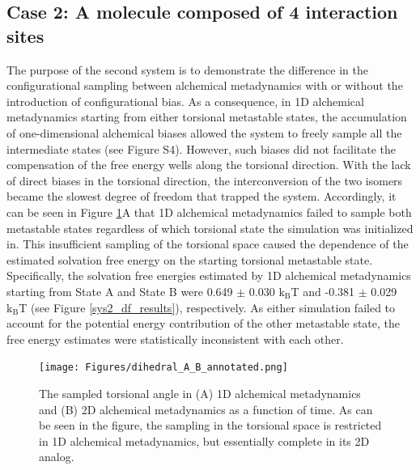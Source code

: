 \documentclass[journal=jacsat,manuscript=article]{achemso}
\begin{document}
\subsection{Case 2: A molecule composed of 4 interaction sites}
The purpose of the second system is to demonstrate the difference in the configurational sampling between alchemical metadynamics with or without the introduction of configurational bias. As a consequence, in 1D alchemical metadynamics starting from either torsional metastable states, the accumulation of one-dimensional alchemical biases allowed the system to freely sample all the intermediate states (see Figure S4). However, such biases did not facilitate the compensation of the free energy wells along the torsional direction. With the lack of direct biases in the torsional direction, the interconversion of the two isomers became the slowest degree of freedom that trapped the system. Accordingly, it can be seen in Figure \ref{dihedral_A_B}A that 1D alchemical metadynamics failed to sample both metastable states regardless of which torsional state the simulation was initialized in. This insufficient sampling of the torsional space caused the dependence of the estimated solvation free energy on the starting torsional metastable state. Specifically, the solvation free energies estimated by 1D alchemical metadynamics starting from State A and State B were 0.649 $\pm$ 0.030 $\text{k}_{\text{B}}\text{T}$ and -0.381 $\pm$ 0.029 $\text{k}_{\text{B}}\text{T}$ (see Figure \ref{sys2_df_results}), respectively. As either simulation failed to account for the potential energy contribution of the other metastable state, the free energy estimates were statistically inconsistent with each other. 

\begin{figure}[ht]
    \centering
    \texttt{[image: Figures/dihedral\_A\_B\_annotated.png]}   
    \caption{The sampled torsional angle in (A) 1D alchemical metadynamics and (B) 2D alchemical metadynamics as a function of time. As can be seen in the figure, the sampling in the torsional space is restricted in 1D alchemical metadynamics, but essentially complete in its 2D analog.}
    \label{dihedral_A_B}
\end{figure}
\end{document}
